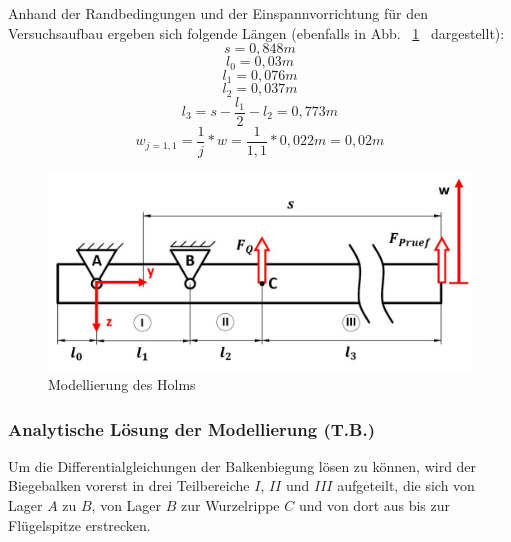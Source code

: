 \noindent Anhand der Randbedingungen und der Einspannvorrichtung für den Versuchsaufbau ergeben sich folgende Längen (ebenfalls in Abb. ~\ref{fig:Holmmodellierung}~ dargestellt): 
\begin{equation}
	s = 0,848 m
\end{equation}
\begin{equation}
	l_{0} = 0,03 m
\end{equation}
\begin{equation}
	l_{1} = 0,076 m
\end{equation}
\begin{equation}
	l_{2} = 0,037 m 
\end{equation}
\begin{equation}
	l_{3} = s - \frac{l_{1}}{2} - l_{2} = 0,773 m
\end{equation}
\begin{equation}
	w_{j=1,1} = \frac{1}{j} * w = \frac{1}{1,1} * 0,022 m = 0,02 m
\end{equation}
\begin{figure}
	\includegraphics[width=1.0\textwidth]{Bilder/Balkenmodell2.jpg}
	\caption{Modellierung des Holms}
	\label{fig:Holmmodellierung}
\end{figure}

\subsubsection{Analytische Lösung der Modellierung (T.B.)}
Um die Differentialgleichungen der Balkenbiegung lösen zu können, wird der Biegebalken vorerst in drei Teilbereiche $I$, $II$ und $III$ aufgeteilt, die sich von Lager $A$ zu $B$, von Lager $B$ zur Wurzelrippe $C$ und von dort aus bis zur Flügelspitze erstrecken. \\

